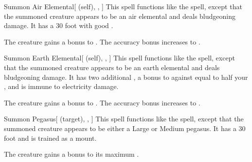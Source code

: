 \lowercase{\hypertarget{spell:Summon Air Elemental}{}}\label{spell:Summon Air Elemental}
\begin{attuneability}[Rank 4]{\hypertarget{spell:Summon Air Elemental}{Summon Air Elemental}}[ (self), , ]
This spell functions like the  spell, except that the summoned creature appears to be an air elemental and deals bludgeoning damage.
It has a 30 foot  with good .

\rankline
{} The creature gains a  bonus to .
 The accuracy bonus increases to .
\end{attuneability}
\vspace{0.25em}



\lowercase{\hypertarget{spell:Summon Earth Elemental}{}}\label{spell:Summon Earth Elemental}
\begin{attuneability}[Rank 4]{\hypertarget{spell:Summon Earth Elemental}{Summon Earth Elemental}}[ (self), , ]
This spell functions like the  spell, except that the summoned creature appears to be an earth elemental and deals bludgeoning damage.
It has two additional , a bonus to  against  equal to half your , and is immune to electricity damage.

\rankline
{} The creature gains a  bonus to .
 The accuracy bonus increases to .
\end{attuneability}
\vspace{0.25em}



\lowercase{\hypertarget{spell:Summon Pegasus}{}}\label{spell:Summon Pegasus}
\begin{attuneability}[Rank 5]{\hypertarget{spell:Summon Pegasus}{Summon Pegasus}}[ (target), , ]
This spell functions like the  spell, except that the summoned creature appears to be either a Large or Medium pegasus.
It has a 30 foot  and is trained as a mount.

\rankline
{} The creature gains a  bonus to its maximum .
\end{attuneability}
\vspace{0.25em}



